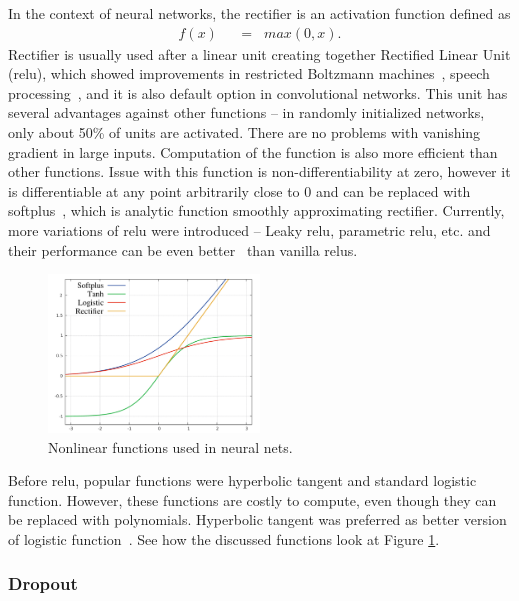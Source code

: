 In the context of neural networks, the rectifier is an activation function defined as
\begin{align}
f(x) \hspace{7pt}&=\hspace{7pt} max(0,x). \label{eq:rectifier}
\end{align}
Rectifier is usually used after a linear unit creating together Rectified Linear Unit (\gls{relu}), which showed improvements in restricted Boltzmann machines~\cite{DBLP:conf/icml/NairH10}, speech processing~\cite{zeiler2013rectified}, and it is also default option in convolutional networks. This unit has several advantages against other functions -- in randomly initialized networks, only about 50\% of units are activated. There are no problems with vanishing gradient in large inputs. Computation of the function is also more efficient than other functions. Issue with this function is non-differentiability at zero, however it is differentiable at any point arbitrarily close to 0 and can be replaced with softplus~\cite{dugas2001incorporating}, which is analytic function smoothly approximating rectifier. Currently, more variations of \gls{relu} were introduced -- Leaky \gls{relu}, parametric \gls{relu}, etc. and their performance can be even better~\cite{DBLP:journals/corr/XuWCL15} than vanilla \gls{relu}s.

\begin{figure}[!t]
	\centering
	\includegraphics[width=0.5\textwidth]{fig/nonlinearities.pdf}
	\caption{Nonlinear functions used in neural nets.
		\label{fig:nonlinear}}
\end{figure}
Before \gls{relu}, popular functions were hyperbolic tangent and standard logistic function. However, these functions are costly to compute, even though they can be replaced with polynomials. Hyperbolic tangent was preferred as better version of logistic function~\cite{lecun2012efficient}. See how the discussed functions look at Figure \ref{fig:nonlinear}.

\subsubsection{Dropout}

